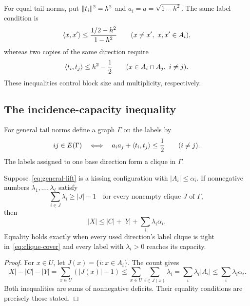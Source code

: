 For equal tail norms, put $\lVert t_i\rVert^2=h^2$ and
$a_i=a=\sqrt{1-h^2}$. The same-label condition is
\begin{equation}\label{eq:block-threshold}
 \langle x,x'\rangle\le\frac{1/2-h^2}{1-h^2}\qquad(x\ne x',\ x,x'\in A_i),
\end{equation}
whereas two copies of the same direction require
\begin{equation}\label{eq:reuse-threshold}
 \langle t_i,t_j\rangle\le h^2-\frac12\qquad(x\in A_i\cap A_j,\ i\ne j).
\end{equation}
These inequalities control block size and multiplicity, respectively.

\subsection{The incidence-capacity inequality}
For general tail norms define a graph $\Gamma$ on the labels by
\begin{equation}\label{eq:reuse-graph}
 ij\in E(\Gamma)\quad\Longleftrightarrow\quad
 a_i a_j+\langle t_i,t_j\rangle\le\frac12\qquad(i\ne j).
\end{equation}
The labels assigned to one base direction form a clique in $\Gamma$.

\begin{proposition}\label{prop:weighted}
Suppose~\eqref{eq:general-lift} is a kissing configuration with
$|A_i|\le\alpha_i$. If nonnegative numbers $\lambda_1,\ldots,\lambda_\ell$
satisfy
\begin{equation}\label{eq:clique-cover}
 \sum_{i\in J}\lambda_i\ge |J|-1
 \quad\text{for every nonempty clique }J\text{ of }\Gamma,
\end{equation}
then
\begin{equation}\label{eq:weighted-capacity}
 |X|\le |C|+|Y|+\sum_i\lambda_i\alpha_i.
\end{equation}
Equality holds exactly when every used direction's label clique is
tight in~\eqref{eq:clique-cover} and every label with
$\lambda_i>0$ reaches its capacity.
\end{proposition}
\begin{proof}
For $x\in U$, let $J(x)=\{i:x\in A_i\}$. The count gives
\[
 |X|-|C|-|Y|=\sum_{x\in U}(|J(x)|-1)
 \le\sum_{x\in U}\sum_{i\in J(x)}\lambda_i
 =\sum_i\lambda_i|A_i|\le\sum_i\lambda_i\alpha_i.
\]
Both inequalities are sums of nonnegative deficits. Their equality
conditions are precisely those stated.
\end{proof}

